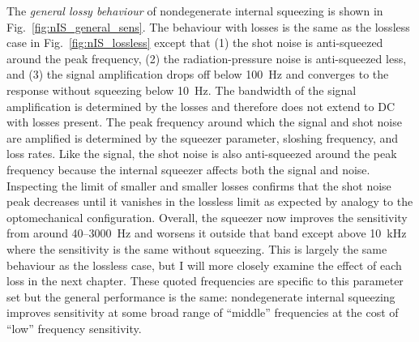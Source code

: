 The \emph{general lossy behaviour} of nondegenerate internal squeezing is shown in Fig.~\ref{fig:nIS_general_sens}. 
The behaviour with losses is the same as the lossless case in Fig.~\ref{fig:nIS_lossless} except that (1) the shot noise is anti-squeezed around the peak frequency, (2) the radiation-pressure noise is anti-squeezed less, and (3) the signal amplification drops off below 100~Hz and converges to the response without squeezing below 10~Hz. The bandwidth of the signal amplification is determined by the losses and therefore does not extend to DC with losses present. The peak frequency around which the signal and shot noise are amplified is determined by the squeezer parameter, sloshing frequency, and loss rates.
Like the signal, the shot noise is also anti-squeezed around the peak frequency because the internal squeezer affects both the signal and noise. %
Inspecting the limit of smaller and smaller losses confirms that the shot noise peak decreases until it vanishes in the lossless limit as expected by analogy to the optomechanical configuration.
Overall, the squeezer now improves the sensitivity from around 40--3000~Hz and worsens it outside that band except above 10~kHz where the sensitivity is the same without squeezing. This is largely the same behaviour as the lossless case, but I will more closely examine the effect of each loss in the next chapter.
These quoted frequencies are specific to this parameter set but the general performance is the same: nondegenerate internal squeezing improves sensitivity at some broad range of ``middle'' frequencies at the cost of ``low'' frequency sensitivity. 

